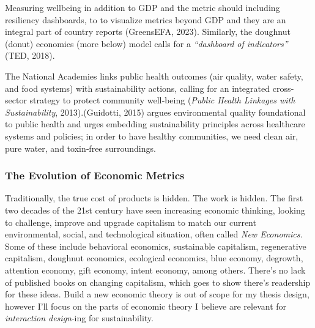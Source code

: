 \documentclass[
  12pt,
  letterpaper,
  DIV=11,
  numbers=noendperiod]{scrartcl}
\begin{document}
Measuring wellbeing in addition to GDP and the metric should including
resiliency dashboards, to to visualize metrics beyond GDP and they are
an integral part of country reports (GreensEFA, 2023). Similarly, the
doughnut (donut) economics (more below) model calls for a
\emph{``dashboard of indicators''} (TED, 2018).

The National Academies links public health outcomes (air quality, water
safety, and food systems) with sustainability actions, calling for an
integrated cross‐sector strategy to protect community well‐being
(\emph{Public {Health Linkages} with {Sustainability}}, 2013).(Guidotti,
2015) argues environmental quality foundational to public health and
urges embedding sustainability principles across healthcare systems and
policies; in order to have healthy communities, we need clean air, pure
water, and toxin‐free surroundings.

\subsubsection{The Evolution of Economic
Metrics}\label{the-evolution-of-economic-metrics}

Traditionally, the true cost of products is hidden. The work is hidden.
The first two decades of the 21st century have seen increasing economic
thinking, looking to challenge, improve and upgrade capitalism to match
our current environmental, social, and technological situation, often
called \emph{New Economics.} Some of these include behavioral economics,
sustainable capitalism, regenerative capitalism, doughnut economics,
ecological economics, blue economy, degrowth, attention economy, gift
economy, intent economy, among others. There's no lack of published
books on changing capitalism, which goes to show there's readership for
these ideas. Build a new economic theory is out of scope for my thesis
design, however I'll focus on the parts of economic theory I believe are
relevant for \emph{interaction design}-ing for sustainability.
\end{document}
